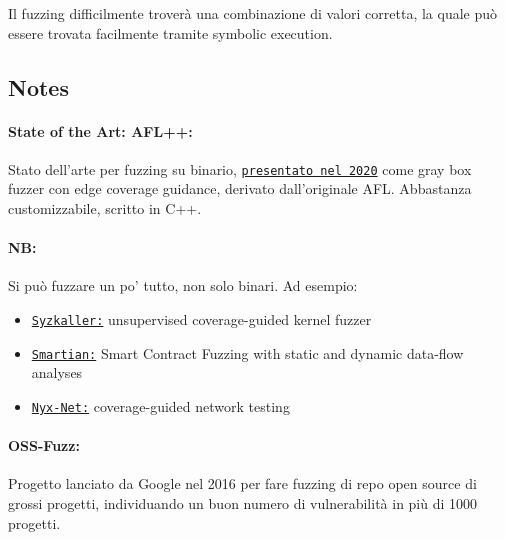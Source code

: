 Il fuzzing difficilmente troverà una combinazione di valori corretta, la quale può essere trovata facilmente tramite symbolic execution.

\vfill

\subsection*{Notes}

\paragraph{State of the Art: AFL++:} Stato dell'arte per fuzzing su binario, \href{https://www.usenix.org/system/files/woot20-paper-fioraldi.pdf}{\texttt{presentato nel 2020}} come gray box fuzzer con edge coverage guidance, derivato dall'originale AFL. Abbastanza customizzabile, scritto in C++. 

\paragraph{NB:} Si può fuzzare un po' tutto, non solo binari. Ad esempio:
\begin{itemize}
	\item \href{https://github.com/google/syzkaller}{\texttt{Syzkaller:}} unsupervised coverage-guided kernel fuzzer

	\item \href{https://softsec.kaist.ac.kr/~sangkilc/papers/choi-ase2021.pdf}{\texttt{Smartian:}} Smart Contract Fuzzing with static and dynamic data-flow analyses

	\item \href{https://dl.acm.org/doi/pdf/10.1145/3492321.3519591}{\texttt{Nyx-Net:}} coverage-guided network testing
\end{itemize}

\paragraph{OSS-Fuzz:} Progetto lanciato da Google nel 2016 per fare fuzzing di repo open source di grossi progetti, individuando un buon numero di vulnerabilità in più di 1000 progetti.

